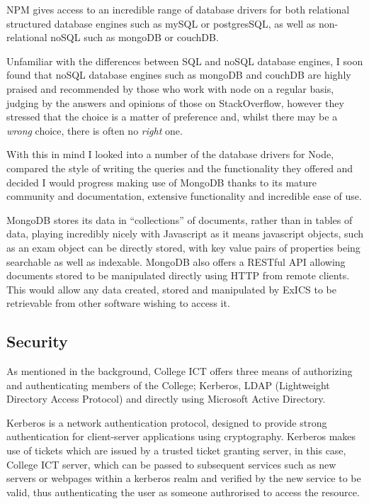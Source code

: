 NPM gives access to an incredible range of database drivers for both relational structured database engines such as mySQL or postgresSQL, as well as non-relational noSQL such as mongoDB or couchDB.

Unfamiliar with the differences between SQL and noSQL database engines, I soon found that noSQL database engines such as mongoDB and couchDB are highly praised and recommended by those who work with node on a regular basis, judging by the answers and opinions of those on StackOverflow, however they stressed that the choice is a matter of preference and, whilst there may be a \textit{wrong} choice, there is often no \textit{right} one.\cite{databaseChoice}

With this in mind I looked into a number of the database drivers for Node, compared the style of writing the queries and the functionality they offered and decided I would progress making use of MongoDB thanks to its mature community and documentation, extensive functionality and incredible ease of use.

MongoDB stores its data in ``collections'' of documents, rather than in tables of data, playing incredibly nicely with Javascript as it means javascript objects, such as an exam object can be directly stored, with key value pairs of properties being searchable as well as indexable.  MongoDB also offers a RESTful API allowing documents stored to be manipulated directly using HTTP from remote clients.  This would allow any data created, stored and manipulated by ExICS to be retrievable from other software wishing to access it.

\subsection{Security}

As mentioned in the background, College ICT offers three means of authorizing and authenticating members of the College; Kerberos, LDAP (Lightweight Directory Access Protocol) and directly using Microsoft Active Directory.

Kerberos is a network authentication protocol, designed to provide strong authentication for client-server applications using cryptography.\cite{whatiskerberos}  Kerberos makes use of tickets which are issued by a trusted ticket granting server, in this case, College ICT server, which can be passed to subsequent services such as new servers or webpages within a kerberos realm and verified by the new service to be valid, thus authenticating the user as someone authrorised to access the resource.\cite{explainlikeIm5}

